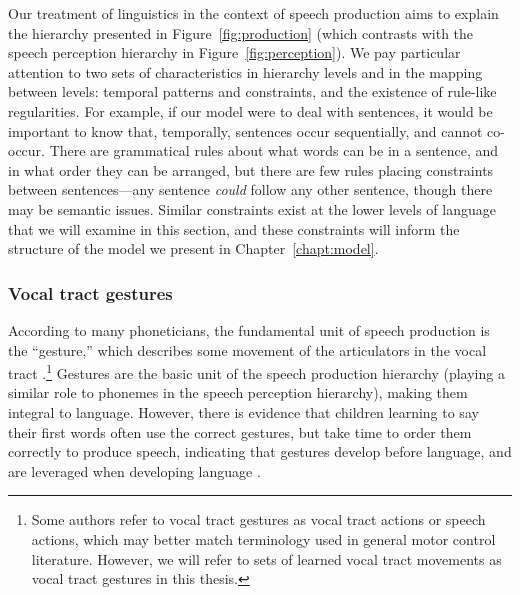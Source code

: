Our treatment of linguistics
in the context of speech production
aims to explain the hierarchy
presented in Figure~\ref{fig:production}
(which contrasts with the speech perception
hierarchy in Figure~\ref{fig:perception}).
We pay particular attention to two
sets of characteristics in hierarchy levels
and in the mapping between levels:
temporal patterns and constraints,
and the existence of rule-like regularities.
For example,
if our model were to deal with sentences,
it would be important to know that,
temporally, sentences occur sequentially,
and cannot co-occur.
There are grammatical rules
about what words can be in a sentence,
and in what order they can be arranged,
but there are few rules placing constraints
between sentences---any sentence \textit{could}
follow any other sentence,
though there may be semantic issues.
Similar constraints exist at
the lower levels of language that
we will examine in this section,
and these constraints will
inform the structure of the model
we present in Chapter~\ref{chapt:model}.


\subsubsection{Vocal tract gestures}
\label{sec:gestures}

According to many phoneticians,
the fundamental unit of speech production
is the ``gesture,''
which describes some movement
of the articulators in the vocal tract
\citep{browman1989,goldstein2006}.\footnote{
  Some authors refer to vocal tract gestures
  as vocal tract actions or speech actions,
  which may better match terminology used in
  general motor control literature.
  However, we will refer to
  sets of learned vocal tract movements as
  vocal tract gestures in this thesis.}
Gestures are the basic unit of
the speech production hierarchy
(playing a similar role to phonemes
in the speech perception hierarchy),
making them integral to language.
However, there is evidence that children
learning to say their first words
often use the correct gestures,
but take time to order them correctly
to produce speech,
indicating that gestures develop
before language,
and are leveraged when
developing language
\citep{browman1989}.


